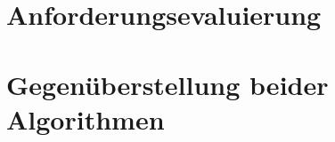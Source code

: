 \section{Anforderungsevaluierung}
\label{sec:anforderunsevaluierung}

\section{Gegenüberstellung beider Algorithmen}
\label{sec:gegenueberstellung}
